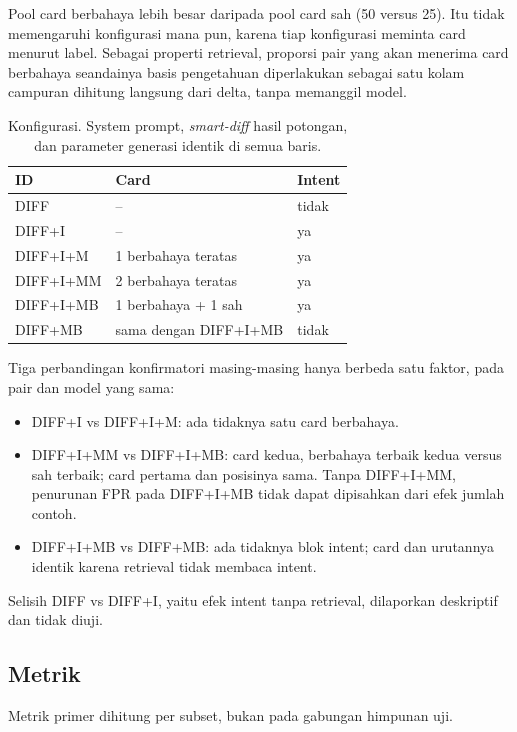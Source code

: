 \documentclass[a4paper,fleqn]{cas-dc}
\begin{document}
Pool card berbahaya lebih besar daripada pool card sah (50 versus 25). Itu tidak
memengaruhi konfigurasi mana pun, karena tiap konfigurasi meminta card menurut
label. Sebagai properti retrieval, proporsi pair yang akan menerima card
berbahaya seandainya basis pengetahuan diperlakukan sebagai satu kolam campuran
dihitung langsung dari delta, tanpa memanggil model.

\begin{table}[t]
\caption{Konfigurasi. System prompt, \emph{smart-diff} hasil potongan, dan
parameter generasi identik di semua baris.}
\label{tab:configs}
\small
\begin{tabular}{lll}
\hline
ID & Card & Intent \\
\hline
DIFF & -- & tidak \\
DIFF+I & -- & ya \\
DIFF+I+M & 1 berbahaya teratas & ya \\
DIFF+I+MM & 2 berbahaya teratas & ya \\
DIFF+I+MB & 1 berbahaya + 1 sah & ya \\
DIFF+MB & sama dengan DIFF+I+MB & tidak \\
\hline
\end{tabular}
\end{table}

Tiga perbandingan konfirmatori masing-masing hanya berbeda satu faktor, pada
pair dan model yang sama:

\begin{itemize}
\item DIFF+I vs DIFF+I+M: ada tidaknya satu card berbahaya.
\item DIFF+I+MM vs DIFF+I+MB: card kedua, berbahaya terbaik kedua versus sah
terbaik; card pertama dan posisinya sama. Tanpa DIFF+I+MM, penurunan FPR pada
DIFF+I+MB tidak dapat dipisahkan dari efek jumlah contoh.
\item DIFF+I+MB vs DIFF+MB: ada tidaknya blok intent; card dan urutannya
identik karena retrieval tidak membaca intent.
\end{itemize}

Selisih DIFF vs DIFF+I, yaitu efek intent tanpa retrieval, dilaporkan
deskriptif dan tidak diuji.

\subsection{Metrik}\label{sec:metrics}

Metrik primer dihitung per subset, bukan pada gabungan himpunan uji.
\end{document}

